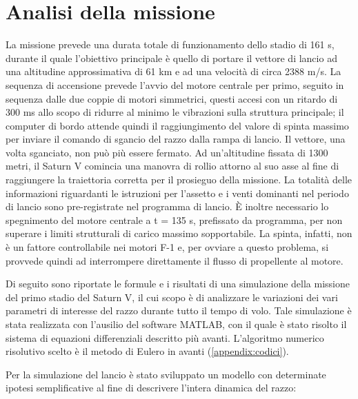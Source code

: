 \section{Analisi della missione}
\label{sec:analisi missione}

La missione prevede una durata totale di funzionamento dello stadio di 161 s, durante il quale l’obiettivo principale è quello di portare il vettore di lancio ad una altitudine approssimativa di 61 km e ad una velocità di circa 2388 m/s. La sequenza di accensione prevede l’avvio del motore centrale per primo, seguito in sequenza dalle due coppie di motori simmetrici, questi accesi con un ritardo di 300 ms allo scopo di ridurre al minimo le vibrazioni sulla struttura principale; il computer di bordo attende quindi il raggiungimento del valore di spinta massimo per inviare il comando di sgancio del razzo dalla rampa di lancio. Il vettore, una volta sganciato, non può più essere fermato. Ad un’altitudine fissata di 1300 metri, il Saturn V comincia una manovra di rollio attorno al suo asse al fine di raggiungere la traiettoria corretta per il prosieguo della missione. La totalità delle informazioni riguardanti le istruzioni per l’assetto e i venti dominanti nel periodo di lancio sono pre-registrate nel programma di lancio. È inoltre necessario lo spegnimento del motore centrale a t = 135 s, prefissato da programma, per non superare i limiti strutturali di carico massimo sopportabile. La spinta, infatti, non è un fattore controllabile nei motori F-1 e, per ovviare a questo problema, si provvede quindi ad interrompere direttamente il flusso di propellente al motore. \cite{flight_manual}
\cite{launch_report}

Di seguito sono riportate le formule e i risultati di una simulazione della missione del primo stadio del Saturn V, il cui scopo è di analizzare le variazioni dei vari parametri di interesse del razzo durante tutto il tempo di volo. Tale simulazione è stata realizzata con l'ausilio del software MATLAB, con il quale è stato risolto il sistema di equazioni differenziali descritto più avanti. L'algoritmo numerico risolutivo scelto è il metodo di Eulero in avanti (\autoref{appendix:codici}).

Per la simulazione del lancio è stato sviluppato un modello con determinate ipotesi semplificative al fine di descrivere l’intera dinamica del razzo:

